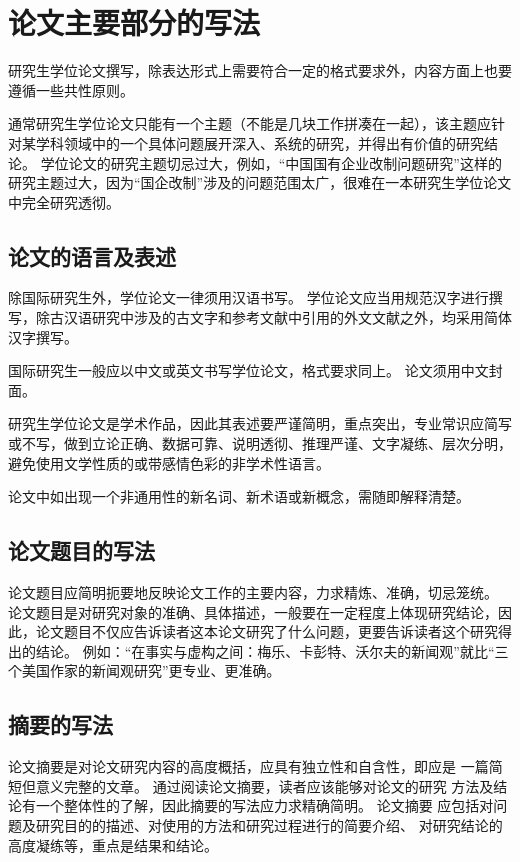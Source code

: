 \chapter{论文主要部分的写法}

研究生学位论文撰写，除表达形式上需要符合一定的格式要求外，内容方面上也要遵循一些共性原则。

通常研究生学位论文只能有一个主题（不能是几块工作拼凑在一起），该主题应针对某学科领域中的一个具体问题展开深入、系统的研究，并得出有价值的研究结论。
学位论文的研究主题切忌过大，例如，“中国国有企业改制问题研究”这样的研究主题过大，因为“国企改制”涉及的问题范围太广，很难在一本研究生学位论文中完全研究透彻。



\section{论文的语言及表述}

除国际研究生外，学位论文一律须用汉语书写。
学位论文应当用规范汉字进行撰写，除古汉语研究中涉及的古文字和参考文献中引用的外文文献之外，均采用简体汉字撰写。

国际研究生一般应以中文或英文书写学位论文，格式要求同上。
论文须用中文封面。

研究生学位论文是学术作品，因此其表述要严谨简明，重点突出，专业常识应简写或不写，做到立论正确、数据可靠、说明透彻、推理严谨、文字凝练、层次分明，避免使用文学性质的或带感情色彩的非学术性语言。

论文中如出现一个非通用性的新名词、新术语或新概念，需随即解释清楚。


\section{论文题目的写法}

论文题目应简明扼要地反映论文工作的主要内容，力求精炼、准确，切忌笼统。
论文题目是对研究对象的准确、具体描述，一般要在一定程度上体现研究结论，因此，论文题目不仅应告诉读者这本论文研究了什么问题，更要告诉读者这个研究得出的结论。
例如：“在事实与虚构之间：梅乐、卡彭特、沃尔夫的新闻观”就比“三个美国作家的新闻观研究”更专业、更准确。



\section{摘要的写法}

论文摘要是对论文研究内容的高度概括，应具有独立性和自含性，即应是 一篇简短但意义完整的文章。
通过阅读论文摘要，读者应该能够对论文的研究 方法及结论有一个整体性的了解，因此摘要的写法应力求精确简明。
论文摘要 应包括对问题及研究目的的描述、对使用的方法和研究过程进行的简要介绍、 对研究结论的高度凝练等，重点是结果和结论。

